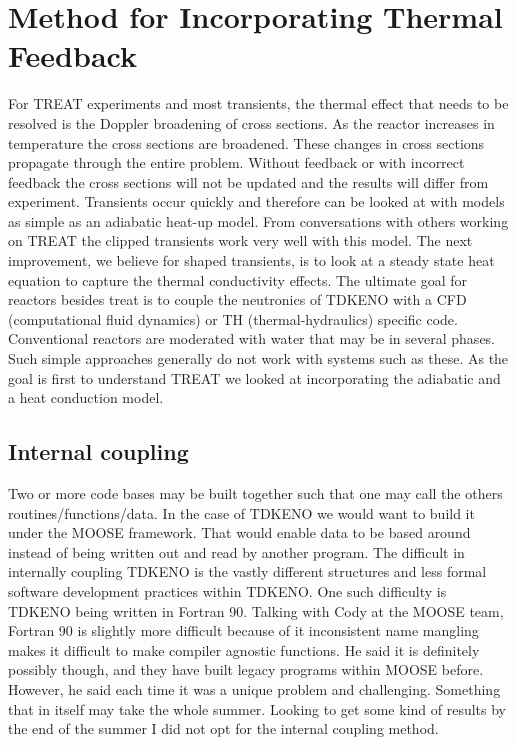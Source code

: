 \documentclass[11pt]{article}
\begin{document}
\section{Method for Incorporating Thermal Feedback}

For TREAT experiments and most transients, the thermal effect that needs to be resolved is the Doppler broadening of cross sections.  As the reactor increases in temperature the cross sections are broadened.  These changes in cross sections propagate through the entire problem.  Without feedback or with incorrect feedback the cross sections will not be updated and the results will differ from experiment.  Transients occur quickly and therefore can be looked at with models as simple as an adiabatic heat-up model.  From conversations with others working on TREAT the clipped transients work very well with this model.  The next improvement, we believe for shaped transients, is to look at a steady state heat equation to capture the thermal conductivity effects.  The ultimate goal for reactors besides treat is to couple the neutronics of TDKENO with a CFD (computational fluid dynamics) or TH (thermal-hydraulics) specific code.  Conventional reactors are moderated with water that may be in several phases.  Such simple approaches generally do not work with systems such as these.  As the goal is first to understand TREAT we looked at incorporating the adiabatic and a heat conduction model.

\subsection{Internal coupling}
 Two or more code bases may be built together such that one may call the others routines/functions/data.  In the case of TDKENO we would want to build it under the MOOSE framework.  That would enable data to be based around instead of being written out and read by another program.  The difficult in internally coupling TDKENO is the vastly different structures and less formal software development practices within TDKENO.  One such difficulty is TDKENO being written in Fortran 90.  Talking with Cody at the MOOSE team, Fortran 90 is slightly more difficult because of it inconsistent name mangling makes it difficult to make compiler agnostic functions.  He said it is definitely possibly though, and they have built legacy programs within MOOSE before.  However, he said each time it was a unique problem and challenging.  Something that in itself may take the whole summer.  Looking to get some kind of results by the end of the summer I did not opt for the internal coupling method.
\end{document}

